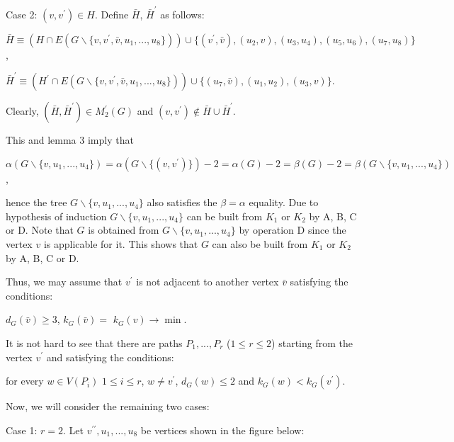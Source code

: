 \documentclass{article}
\begin{document}
Case 2: $(v,v^{\prime })\in H$. Define $\bar{H}$, $\bar{H}^{\prime }$ as
follows:

\begin{center}
$\bar{H}\equiv (H\cap E(G\backslash \{v,v^{\prime },\bar{v},u_{1},...,u_{8}\}))\cup \{(v^{\prime },\bar{v}),(u_{2},v),(u_{3},u_{4}),(u_{5},u_{6}),(u_{7},u_{8})\}$,

$\bar{H}^{\prime }\equiv (H^{\prime }\cap E(G\backslash \{v,v^{\prime },\bar{v},u_{1},...,u_{8}\}))\cup \{(u_{7},\bar{v}),(u_{1},u_{2}),(u_{3},v)\}$.
\end{center}

Clearly, $(\bar{H},\bar{H}^{\prime })\in M_{2}^{\prime }(G)$ and $(v,v^{\prime })\notin \bar{H}\cup \bar{H}^{\prime }$.

This and lemma 3 imply that

\begin{center}
$\alpha (G\backslash \{v,u_{1},...,u_{4}\})=\alpha (G\backslash
\{(v,v^{\prime })\})-2=\alpha (G)-2=\beta (G)-2=\beta (G\backslash
\{v,u_{1},...,u_{4}\})$,
\end{center}

hence the tree $G\backslash \{v,u_{1},...,u_{4}\}$ also satisfies the $\beta
=\alpha $ equality. Due to hypothesis of induction $G\backslash
\{v,u_{1},...,u_{4}\}$ can be built from $K_{1}$ or $K_{2}$ by A, B, C or D.
Note that $G$ is obtained from $G\backslash \{v,u_{1},...,u_{4}\}$ by
operation D since the vertex $v$ is applicable for it. This shows that $G$
can also be built from $K_{1}$ or $K_{2}$ by A, B, C or D.

Thus, we may assume that $v^{\prime }$ is not adjacent to another vertex $\bar{v}$ satisfying the conditions:

\begin{center}
$d_{G}(\bar{v})\geq 3$, $k_{G}(\bar{v})=$ $k_{G}(v)\rightarrow \min $.
\end{center}

It is not hard to see that there are paths $P_{1},...,P_{r}$ ($1\leq r\leq 2$) starting from the vertex $v^{\prime }$ and satisfying the conditions:

\begin{center}
for every $w\in V(P_{i})$ $1\leq i\leq r$, $w\neq v^{\prime }$, $d_{G}(w)\leq 2$ and $k_{G}(w)<k_{G}(v^{\prime })$.
\end{center}

Now, we will consider the remaining two cases:

Case 1: $r=2$. Let $v^{\prime \prime },u_{1},...,u_{8}$ be vertices shown in
the figure below:
\end{document}
